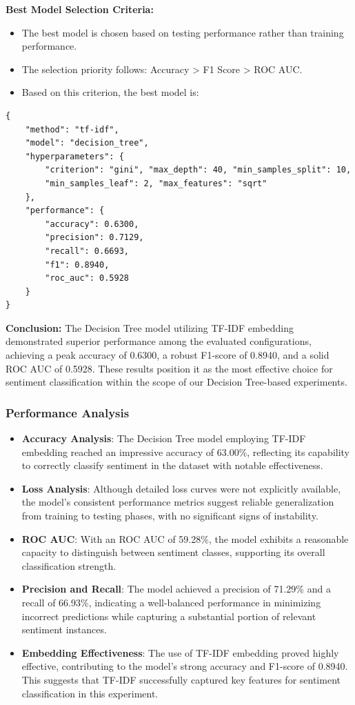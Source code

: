 \textbf{Best Model Selection Criteria:}

\begin{itemize}
    \item The best model is chosen based on testing performance rather than training performance.
    \item The selection priority follows: Accuracy > F1 Score > ROC AUC.
    \item Based on this criterion, the best model is:
\end{itemize}

\begin{verbatim}
{
    "method": "tf-idf",
    "model": "decision_tree",
    "hyperparameters": {
        "criterion": "gini", "max_depth": 40, "min_samples_split": 10, 
        "min_samples_leaf": 2, "max_features": "sqrt"
    },
    "performance": {
        "accuracy": 0.6300,
        "precision": 0.7129,
        "recall": 0.6693,
        "f1": 0.8940,
        "roc_auc": 0.5928
    }
}
\end{verbatim}

\textbf{Conclusion:} The Decision Tree model utilizing TF-IDF embedding demonstrated superior performance among the evaluated configurations, achieving a peak accuracy of 0.6300, a robust F1-score of 0.8940, and a solid ROC AUC of 0.5928. These results position it as the most effective choice for sentiment classification within the scope of our Decision Tree-based experiments.

\subsubsection{Performance Analysis}
\begin{itemize}
    \item \textbf{Accuracy Analysis}: The Decision Tree model employing TF-IDF embedding reached an impressive accuracy of 63.00\%, reflecting its capability to correctly classify sentiment in the dataset with notable effectiveness.
    \item \textbf{Loss Analysis}: Although detailed loss curves were not explicitly available, the model’s consistent performance metrics suggest reliable generalization from training to testing phases, with no significant signs of instability.
    \item \textbf{ROC AUC}: With an ROC AUC of 59.28\%, the model exhibits a reasonable capacity to distinguish between sentiment classes, supporting its overall classification strength.
    \item \textbf{Precision and Recall}: The model achieved a precision of 71.29\% and a recall of 66.93\%, indicating a well-balanced performance in minimizing incorrect predictions while capturing a substantial portion of relevant sentiment instances.
    \item \textbf{Embedding Effectiveness}: The use of TF-IDF embedding proved highly effective, contributing to the model’s strong accuracy and F1-score of 0.8940. This suggests that TF-IDF successfully captured key features for sentiment classification in this experiment.
\end{itemize}

